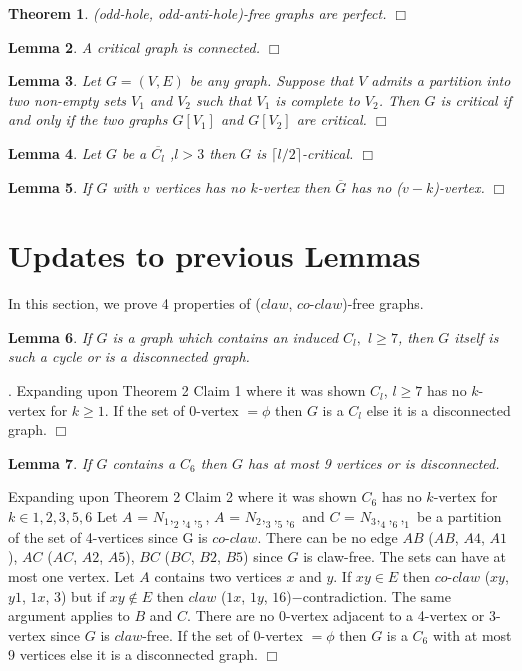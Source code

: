 \documentclass[12pt]{article}
\newtheorem{Theorem}{Theorem}[section]
\newtheorem{Lemma}[Theorem]{Lemma}
\def\CCO{($claw$, $co$-$claw$)}
\begin{document}
\begin{Theorem}\label{thm:StrongPerfect}
(odd-hole, odd-anti-hole)-free graphs are perfect. $\Box$
\end{Theorem}

\begin{Lemma}\label{lem:connected}
A critical graph is connected. $\Box$
\end{Lemma}

\begin{Lemma}\label{lem:join-critical}{\rm \cite{DhaHam2014}}
Let $G=(V,E)$ be any graph.  Suppose that $V$ admits a partition into
two non-empty sets $V_1$ and $V_2$ such that $V_1$ is complete to
$V_2$.  Then $G$ is critical if and only if the two graphs $G[V_1]$
and $G[V_2]$ are critical. $\Box$
\end{Lemma}

\begin{Lemma}\label{lem:anti-hole-critical}
Let $G$ be a $\overline{C_l}$ ,$l >3$ then $G$ is $\lceil l/2 \rceil$-critical. $\Box$
\end{Lemma}

\begin{Lemma}\label{lem:complement-k-vertex}
If $G$ with $v$ vertices has no $k$-vertex then $\overline{G}$ has no ($v-k$)-vertex. $\Box$
\end{Lemma}

\section{Updates to previous Lemmas}\label{sec:updates}
In this section, we prove 4 properties of {\CCO}-free graphs.
\begin{Lemma}\label{lem:C7Cycle}
If $G$ is a graph which contains an induced $C_l,$ $l \geq 7$, then $G$ itself is such a cycle or is a disconnected graph.
\end{Lemma}
.  Expanding \cite{BraFud2002} upon Theorem 2 Claim 1 where it was shown $C_l$, $l \geq 7$ has no $k$-vertex for $k \geq 1$. If the set of 0-vertex $= \phi$ then $G$ is a $C_l$ else it is a disconnected graph.  $\Box$

\medskip

\begin{Lemma}\label{lem:C69V}
If $G$ contains a $C_6$ then $G$ has at most 9 vertices or is disconnected.
\end{Lemma}
 Expanding \cite{BraFud2002} upon Theorem 2 Claim 2 where it was shown $C_6$ has no $k$-vertex for $k \in {1, 2, 3, 5, 6}$ Let $A$ = $N_1,_2,_4,_5$, $A$ = $N_2,_3,_5,_6$ and $C$ = $N_3,_4,_6,_1$ be a partition of the set of 4-vertices since G is $co$-$claw$. There can be no edge $AB$ ($AB$, $A4$, $A1$), $AC$ ($AC$, $A2$, $A5$), $BC$ ($BC$, $B2$, $B5$) since $G$ is claw-free. The sets can have at most one vertex. Let $A$ contains two vertices $x$ and $y$. If $xy \in E$ then $co$-$claw$ ($xy$, $y1$, $1x$, $3$) but if $xy \not\in E$ then $claw$ ($1x$, $1y$, $16$)$-$contradiction. The same argument applies to $B$ and $C$. There are no 0-vertex adjacent to a 4-vertex or 3-vertex since $G$ is $claw$-free. If the set of 0-vertex $= \phi$ then $G$ is a $C_6$ with at most 9 vertices else it is a disconnected graph.  $\Box$
\end{document}
